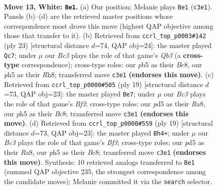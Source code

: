 \documentclass[11pt]{article}
\begin{document}
\clearpage

\begin{figure}[p]\centering
\begin{subfigure}{0.46\textwidth}\centering
\resizebox{\linewidth}{!}{%
\newchessgame
\chessboard[
  setfen={r1b1k2r/2p1qp2/2n2np1/pp1p3p/3P4/2B2NPP/PP2PP2/RK1Q1B1R w kq - 0 13},
  showmover=false,
  pgfstyle=straightmove, color=movearrow, markmove={c3-e1}
]}
\caption{}
\end{subfigure}\hfill
\begin{subfigure}{0.46\textwidth}\centering
\resizebox{\linewidth}{!}{%
\newchessgame
\chessboard[
  setfen={r1b1k2r/1p2bpp1/pq1ppn1p/8/4PP2/1NN5/PPPQ2PP/1K1R1B1R b kq - 1 12},
  showmover=false,
  pgfstyle=straightmove, color=movearrow, markmove={b6-c7}
]}
\caption{}
\end{subfigure}
\\[4pt]
\begin{subfigure}{0.46\textwidth}\centering
\resizebox{\linewidth}{!}{%
\newchessgame
\chessboard[
  setfen={rnb1k2r/1p3ppp/pq1ppb2/8/4PP2/1NN5/PPPQ2PP/R3KB1R b KQkq - 1 10},
  showmover=false,
  pgfstyle=straightmove, color=movearrow, markmove={f6-e7}
]}
\caption{}
\end{subfigure}\hfill
\begin{subfigure}{0.46\textwidth}\centering
\resizebox{\linewidth}{!}{%
\newchessgame
\chessboard[
  setfen={rnb1k2r/1p3ppp/pq1ppb2/8/4PP2/1NN5/PPPQ2PP/R3KB1R b KQkq - 1 10},
  showmover=false,
  pgfstyle=straightmove, color=movearrow, markmove={f6-h4}
]}
\caption{}
\end{subfigure}
\caption{\textbf{Move 13, White: \texttt{Be1}.} (a) Our position; Melanie plays \texttt{Be1} (\texttt{c3e1}). Panels (b)--(d) are the retrieved master positions whose correspondence most drove this move (highest QAP objective among those that transfer to it). (b) Retrieved from \texttt{ccrl\_top\_p0003\#142} (ply 23) [structural distance $d$=74, QAP obj=24]: the master played \texttt{Qc7}; under $\mu$ our \emph{Bc3} plays the role of that game's \emph{Qb3} (a \textbf{cross-type} correspondence); cross-type roles: our \emph{p}b5 as their \emph{B}c8, our \emph{p}h5 as their \emph{R}h8; transferred move \texttt{c3e1} \textbf{(endorses this move)}. (c) Retrieved from \texttt{ccrl\_top\_p0000\#505} (ply 19) [structural distance $d$=73, QAP obj=23]: the master played \texttt{Be7}; under $\mu$ our \emph{Bc3} plays the role of that game's \emph{Bf3}; cross-type roles: our \emph{p}d5 as their \emph{R}a8, our \emph{p}h5 as their \emph{B}c8; transferred move \texttt{c3e1} \textbf{(endorses this move)}. (d) Retrieved from \texttt{ccrl\_top\_p0000\#559} (ply 19) [structural distance $d$=73, QAP obj=23]: the master played \texttt{Bh4+}; under $\mu$ our \emph{Bc3} plays the role of that game's \emph{Bf3}; cross-type roles: our \emph{p}d5 as their \emph{R}a8, our \emph{p}h5 as their \emph{B}c8; transferred move \texttt{c3e1} \textbf{(endorses this move)}. Synthesis: 10 retrieved analogs transferred to \texttt{Be1} (summed QAP objective 235, the strongest correspondence among the candidate moves); Melanie committed it via the \texttt{search} selector.}
\label{fig:thought-m24}
\end{figure}
\end{document}
